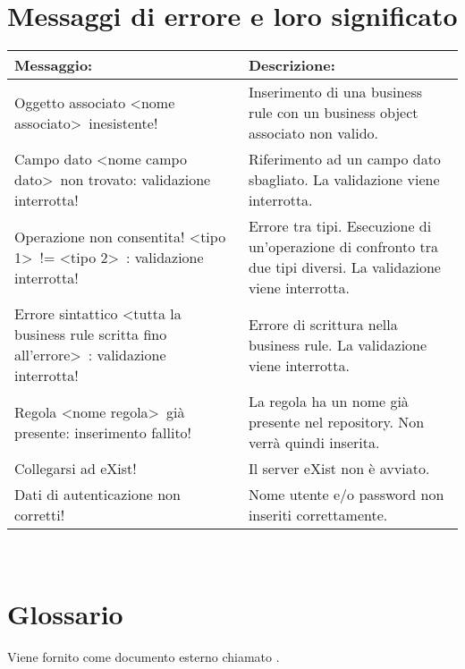 \section{Messaggi di errore e loro significato}
\begin{table}[htbp]
\begin{tabular}{||p{6.5cm}||p{6.5cm}||}
\hline
\textbf{Messaggio:} & \textbf{Descrizione:} \\ \hline
Oggetto associato \textless nome associato\textgreater\ inesistente! & Inserimento di una business rule con un business object associato non valido. \\ \hline
Campo dato \textless nome campo dato\textgreater\ non trovato: validazione interrotta! & Riferimento ad un campo dato sbagliato. La validazione viene interrotta. \\ \hline
Operazione non consentita! \textless tipo 1\textgreater\ != \textless tipo 2\textgreater\ : validazione interrotta! & Errore tra tipi. Esecuzione di un'operazione di confronto tra due tipi diversi. La validazione viene interrotta. \\ \hline
Errore sintattico \textless tutta la business rule scritta fino all'errore\textgreater\ : validazione interrotta! & Errore di scrittura nella business rule. La validazione viene interrotta. \\ \hline
Regola \textless nome regola\textgreater\  gi\`a presente: inserimento fallito! & La regola ha un nome gi\`a presente nel repository. Non verr\`a quindi inserita. \\ \hline
Collegarsi ad eXist! & Il server eXist non \`e avviato. \\ \hline
Dati di autenticazione non corretti! & Nome utente e/o password non inseriti correttamente. \\ \hline
\end{tabular} \\
\end{table}

\section{Glossario}
Viene fornito come documento esterno chiamato \Glossario.


